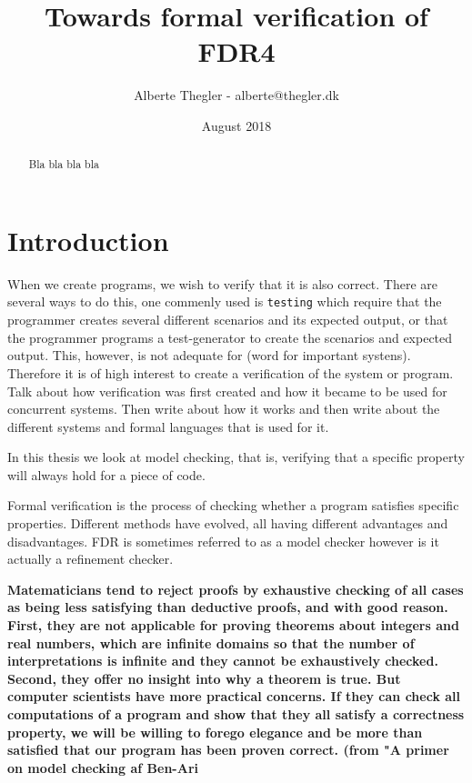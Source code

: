 \documentclass[a4paper]{report}
\title{Towards formal verification of FDR4}
\author{Alberte Thegler - alberte@thegler.dk}
\date{August 2018}
\begin{document}
\maketitle

\begin{abstract}
\begin{doublespace}
Bla bla 
bla bla


\end{doublespace}
\end{abstract}



\newpage
\tableofcontents

\newpage
\listoftodos
\newpage
{}
\chapter{Introduction}
When we create programs, we wish to verify that it is also correct. There are several ways to do this, one commenly used is \texttt{testing} which require that the programmer creates several different scenarios and its expected output, or that the programmer programs a test-generator to create the scenarios and expected output. This, however, is not adequate for (word for important systens). Therefore it is of high interest to create a verification of the system or program.\\
Talk about how verification was first created and how it became to be used for concurrent systems. Then write about how it works and then write about the different systems and formal languages that is used for it. 


In this thesis we look at model checking, that is, verifying that a specific property will always hold for a piece of code.


Formal verification is the process of checking whether a program satisfies specific properties. Different methods have evolved, all having different advantages and disadvantages. FDR is sometimes referred to as a model checker however is it actually a refinement checker.



\textbf{Matematicians tend to reject proofs by exhaustive checking of all cases as being less satisfying than deductive proofs, and with good reason. First, they are not applicable for proving theorems about integers and real numbers, which are infinite domains so that the number of interpretations is infinite and they cannot be exhaustively checked. Second, they offer no insight into why a theorem is true. But computer scientists have more practical concerns. If they can check all computations of a program and show that they all satisfy a correctness property, we will be willing to forego elegance and be more than satisfied that our program has been proven correct. (from "A primer on model checking af Ben-Ari} \cite{Ben-ari2010}
\end{document}
